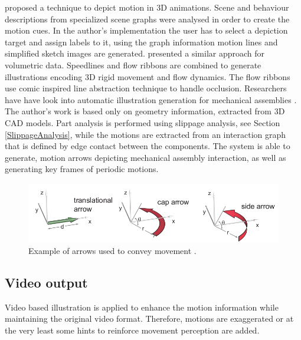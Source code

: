 \cite{Nienhaus2005} proposed a technique to depict motion in 3D animations.
Scene and behaviour descriptions from specialized scene graphs were analysed in order to create the motion cues.
In the author's implementation the user has to select a depiction target and assign labels to it, using the graph information motion lines and simplified sketch images are generated.
\cite{Joshi2005} presented a similar approach for volumetric data.
Speedlines and flow ribbons are combined to generate illustrations encoding 3D rigid movement and flow dynamics.
The flow ribbons use comic inspired line abstraction technique to handle occlusion.
Researchers have have look into automatic illustration generation for mechanical assemblies \cite{Mitra2010}.
The author's work is based only on geometry information, extracted from 3D CAD models.
Part analysis is performed using slippage analysis, see Section \ref{SlippageAnalysis}, while the motions are extracted from an interaction graph that is defined by edge contact between the components.
The system is able to generate, motion arrows depicting mechanical assembly interaction, as well as generating key frames of periodic motions.

\begin{figure}[htbp]
	\centering
	\includegraphics[scale=.5]{images/arrow_types2}
	\caption{Example of arrows used to convey movement \cite{Mitra2010}.}
	\label{fig:arrowTypes}
\end{figure}

\subsection{Video output}

Video based illustration is applied to enhance the motion information while maintaining the original video format.
Therefore, motions are exaggerated or at the very least some hints to reinforce movement perception are added.

